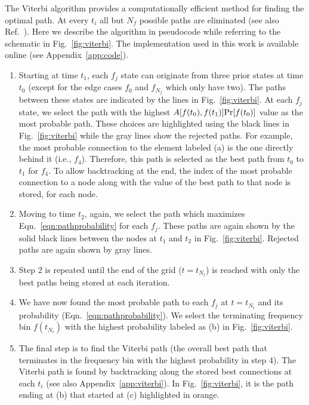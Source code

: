 \documentclass[paper-main.tex]{subfiles}
\begin{document}
The Viterbi algorithm provides a computationally efficient method for finding the optimal path. 
At every $t_i$ all but $N_f$ possible paths are eliminated (see also Ref.~\cite{ScoX1ViterbiO1:2017}). 
Here we describe the algorithm in pseudocode while referring to the schematic in Fig.~\ref{fig:viterbi}. %
The implementation used in this work is available online (see Appendix~\ref{app:code}).
\begin{enumerate}
\item Starting at time $t_1$, each $f_j$ state can originate from three prior states at time $t_0$ (except for the edge cases $f_0$ and $f_{N_f}$ which only have two). 
The paths between these states are indicated by the lines in Fig.~\ref{fig:viterbi}. 
At each $f_j$ state, we select the path with the highest $A[f(t_0),f(t_1)] {\rm Pr}[f(t_0)]$ value as the most probable path. 
These choices are highlighted using the black lines in Fig.~\ref{fig:viterbi} while the gray lines show the rejected paths. 
For example, the most probable connection to the element labeled (a) is the one directly behind it (i.e., $f_4$). 
Therefore, this path is selected as the best path from $t_0$ to $t_1$ for $f_4$.
To allow backtracking at the end, the index of the most probable connection to a node along with the value of the best path to that node is stored, for each node.

\item Moving to time $t_2$, again, we select the path which maximizes Eqn.~\ref{eqn:pathprobability} for each $f_j$. 
These paths are again shown by the solid black lines between the nodes at $t_1$ and $t_2$ in Fig.~\ref{fig:viterbi}.
Rejected paths are again shown by gray lines. 

\item Step 2 is repeated until the end of the grid ($t=t_{N_t}$) is reached with only the best paths being stored at each iteration. 

\item We have now found the most probable path to each $f_j$ at $t=t_{N_t}$ and its probability (Eqn.~\ref{eqn:pathprobability}). 
We select the terminating frequency bin $f(t_{N_t})$ with the highest probability labeled as (b) in Fig.~\ref{fig:viterbi}.

\item The final step is to find the Viterbi path (the overall best path that terminates in the frequency bin with the highest probability in step 4). 
The Viterbi path is found by backtracking along the stored best connections at each $t_i$ (see also Appendix~\ref{app:viterbi}). 
In Fig.~\ref{fig:viterbi}, it is the path ending at (b) that started at (c) highlighted in orange.
\end{enumerate}
\end{document}
